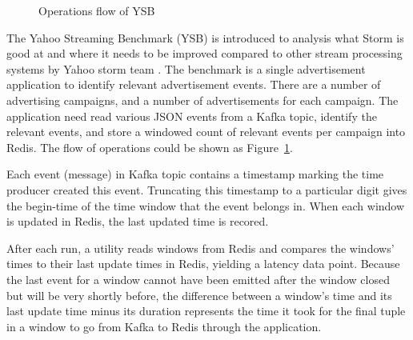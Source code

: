 \begin{figure}
  \begin{center}
   \caption{Operations flow of YSB \cite{YSB}}
   \label{fig:yahoo_stream_bench}
  \end{center}
\end{figure}


The Yahoo Streaming Benchmark (YSB) is introduced to analysis what Storm is good at and where it needs to be improved compared to other stream processing systems by Yahoo storm team \cite{YSB}. The benchmark is a single advertisement application to identify relevant advertisement events. There are a number of advertising campaigns, and a number of advertisements for each campaign. The application need read various JSON events from a Kafka topic, identify the relevant events, and store a windowed count of relevant events per campaign into Redis. The flow of operations could be shown as Figure~\ref{fig:yahoo_stream_bench}.

Each event (message) in Kafka topic contains a timestamp marking the time producer created this event. Truncating this timestamp to a particular digit gives the begin-time of the time window that the event belongs in. When each window is updated in Redis, the last updated time is recored.

After each run, a utility reads windows from Redis and compares the windows' times to their last update times in Redis, yielding a latency data point. Because the last event for a window cannot have been emitted after the window closed but will be very shortly before, the difference between a window's time and its last update time minus its duration represents the time it took for the final tuple in a window to go from Kafka to Redis through the application. \\

